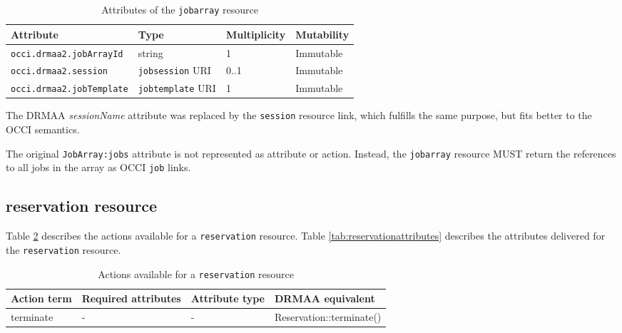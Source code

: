 \documentclass[10pt]{article}
\newcommand{\h}[1]{\lstinline|#1|}
\begin{document}
\begin{table}[ht]
\centering
\begin{tabularx}{\textwidth}{|l|X|X|X|}
\hline
Attribute   & Type                & Multiplicity & Mutability \\
\hline
\h{occi.drmaa2.jobArrayId}  & string              & 1            & Immutable \\ %
\h{occi.drmaa2.session}     & \h{jobsession} URI  & 0..1         & Immutable \\ %
\h{occi.drmaa2.jobTemplate} & \h{jobtemplate} URI & 1            & Immutable \\ %
\hline
\end{tabularx}
\caption{Attributes of the \h{jobarray} resource}
\label{tab:jobattributes}
\end{table}

The DRMAA \emph{sessionName} attribute was replaced by the \h{session} resource link, which fulfills the same purpose, but fits better to the OCCI semantics.

The original \h{JobArray:jobs} attribute is not represented as attribute or action. Instead, the \h{jobarray} resource MUST return the references to all jobs in the array as OCCI \h{job} links. 


\subsection{reservation resource}

Table \ref{tab:reservationactions} describes the actions available for a \h{reservation} resource. Table \ref{tab:reservationattributes} describes the attributes delivered for the \h{reservation} resource.

\begin{table}[ht]
\centering
\begin{tabularx}{\textwidth}{|X|X|X|X|}
\hline
Action term & Required attributes & Attribute type    & DRMAA equivalent        \\
\hline
terminate   & -                   & -                 & Reservation::terminate() \\
\hline
\end{tabularx}
\caption{Actions available for a \h{reservation} resource}
\label{tab:reservationactions}
\end{table}
\end{document}
